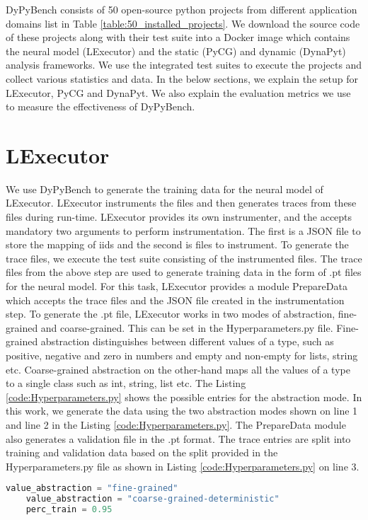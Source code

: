 DyPyBench consists of 50 open-source python projects from different application domains list in Table \ref{table:50_installed_projects}.
We download the source code of these projects along with their test suite into a Docker image which contains the neural model (LExecutor) and the static (PyCG) and dynamic (DynaPyt) analysis frameworks.
We use the integrated test suites to execute the projects and collect various statistics and data.
In the below sections, we explain the setup for LExecutor, PyCG and DynaPyt.
We also explain the evaluation metrics we use to measure the effectiveness of DyPyBench.

\section{LExecutor}
We use DyPyBench to generate the training data for the neural model of LExecutor.
LExecutor instruments the files and then generates traces from these files during run-time.
LExecutor provides its own instrumenter, and the accepts mandatory two arguments to perform instrumentation.
The first is a JSON file to store the mapping of iids and the second is files to instrument.
To generate the trace files, we execute the test suite consisting of the instrumented files.
The trace files from the above step are used to generate training data in the form of .pt files for the neural model.
For this task, LExecutor provides a module PrepareData which accepts the trace files and the JSON file created in the instrumentation step.
To generate the .pt file, LExecutor works in two modes of abstraction, fine-grained and coarse-grained.
This can be set in the Hyperparameters.py file.
Fine-grained abstraction distinguishes between different values of a type, such as positive, negative and zero in numbers and empty and non-empty for lists, string etc.
Coarse-grained abstraction on the other-hand maps all the values of a type to a single class such as int, string, list etc. \cite{LExecutor_2023}
The Listing \ref{code:Hyperparameters.py} shows the possible entries for the abstraction mode.
In this work, we generate the data using the two abstraction modes shown on line 1 and line 2 in the Listing \ref{code:Hyperparameters.py}. 
The PrepareData module also generates a validation file in the .pt format.
The trace entries are split into training and validation data based on the split provided in the Hyperparameters.py file as shown in Listing \ref{code:Hyperparameters.py} on line 3.
\begin{lstlisting}[caption=Abstraction Modes in LExecutor,label=code:Hyperparameters.py,language=Python]
    value_abstraction = "fine-grained"
    value_abstraction = "coarse-grained-deterministic"
    perc_train = 0.95
\end{lstlisting}

